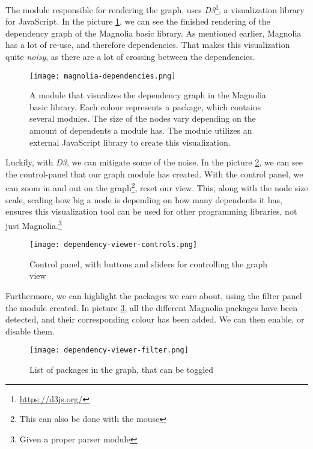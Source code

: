 The module responsible for rendering the graph, uses
\textit{D3}\footnote{\url{https://d3js.org/}}, a visualization library for
JavaScript. In the picture \ref{pic:magLib}, we can see the finished rendering
of the dependency graph of the Magnolia basic library. As mentioned earlier,
Magnolia has a lot of re-use, and therefore dependencies. That makes this
visualization quite \textit{noisy}, as there are a lot of crossing between the
dependencies.

\begin{figure}[H]
  \centering
  \texttt{[image: magnolia-dependencies.png]}
  \caption{
    A module that visualizes the dependency graph in the Magnolia basic library.
    Each colour represents a package, which contains several modules. The size
    of the nodes vary depending on the amount of dependents a module has. The
    module utilizes an external JavaScript library to create this visualization.
  }
  \label{pic:magLib}
\end{figure}

Luckily, with \textit{D3}, we can mitigate some of the noise. In the picture
\ref{pic:depCont}, we can see the control-panel that our graph module has
created. With the control panel, we can zoom in and out on the graph\footnote{This can also be done with the mouse},
reset our view. This, along with the node size scale, scaling how big
a node is depending on how many dependents it has, ensures this visualization
tool can be used for other programming libraries, not just Magnolia.\footnote{Given a proper parser module}

\begin{figure}[H]
  \centering
  \texttt{[image: dependency-viewer-controls.png]}
  \caption{
    Control panel, with buttons and sliders for controlling the graph view
  }
  \label{pic:depCont}
\end{figure}

Furthermore, we can highlight the packages we care about, using the filter
panel the module created. In picture \ref{pic:depFil}, all the different
Magnolia packages have been detected, and their corresponding colour has been
added. We can then enable, or disable them.

\begin{figure}[H]
  \centering
  \texttt{[image: dependency-viewer-filter.png]}
  \caption{List of packages in the graph, that can be toggled}
  \label{pic:depFil}
\end{figure}

